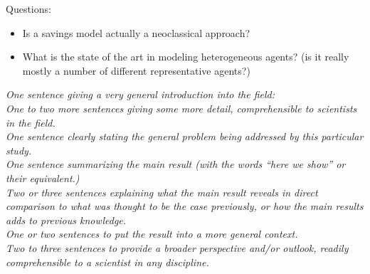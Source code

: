 Questions:
\begin{itemize}
	\item Is a savings model actually a neoclassical approach?
	\item What is the state of the art in modeling heterogeneous agents? (is it really mostly a number of different representative agents?)
\end{itemize}

\emph{One sentence giving a very general introduction into the field:} \\

\emph{One to two more sentences giving some more detail, comprehensible to scientists in the field.} \\

\emph{One sentence clearly stating the general problem being addressed by this particular study.} \\

\emph{One sentence summarizing the main result (with the words ``here we show'' or their equivalent.)} \\

\emph{Two or three sentences explaining what the main result reveals in direct comparison to what was thought to be the case previously, or how the main results adds to previous knowledge.} \\

\emph{One or two sentences to put the result into a more general context.} \\

\emph{Two to three sentences to provide a broader perspective and/or outlook, readily comprehensible to a scientist in any discipline.} \\

